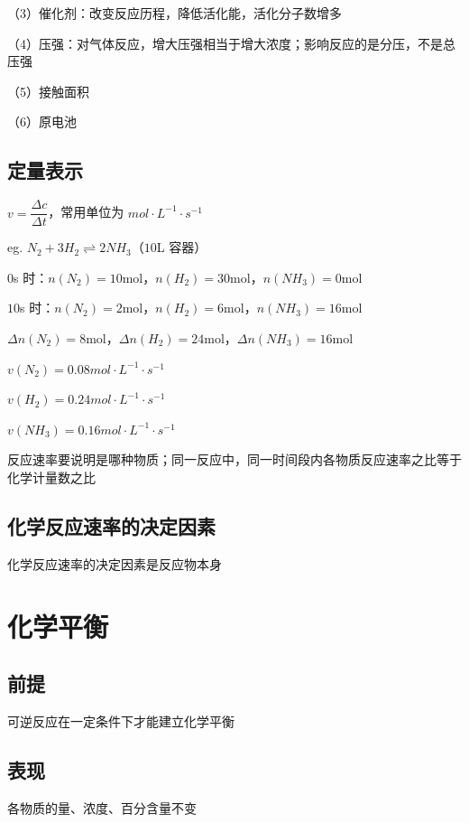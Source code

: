 \documentclass[UTF8,zihao=-4,openany]{ctexbook}
\begin{document}
（3）催化剂：改变反应历程，降低活化能，活化分子数增多\par

（4）压强：对气体反应，增大压强相当于增大浓度；影响反应的是分压，不是总压强\par

（5）接触面积\par

（6）原电池\par
\subsection{定量表示}
$v=\dfrac{\Delta c}{\Delta t}$，常用单位为 $mol\cdot L^{-1}\cdot s^{-1}$\par

eg. $N_2+3H_2\rightleftharpoons2NH_3$（$10$L 容器）\par

$0$s 时：$n(N_2)=10$mol，$n(H_2)=30$mol，$n(NH_3)=0$mol\par

$10$s 时：$n(N_2)=2$mol，$n(H_2)=6$mol，$n(NH_3)=16$mol\par

$\Delta n(N_2)=8$mol，$\Delta n(H_2)=24$mol，$\Delta n(NH_3)=16$mol\par

$v(N_2)=0.08mol\cdot L^{-1}\cdot s^{-1}$\par

$v(H_2)=0.24mol\cdot L^{-1}\cdot s^{-1}$\par

$v(NH_3)=0.16mol\cdot L^{-1}\cdot s^{-1}$\par

反应速率要说明是哪种物质；同一反应中，同一时间段内各物质反应速率之比等于化学计量数之比\par
\subsection{化学反应速率的决定因素}
化学反应速率的决定因素是反应物本身\par
\section{化学平衡}
\subsection{前提}
可逆反应在一定条件下才能建立化学平衡\par
\subsection{表现}
各物质的量、浓度、百分含量不变\par
\end{document}
